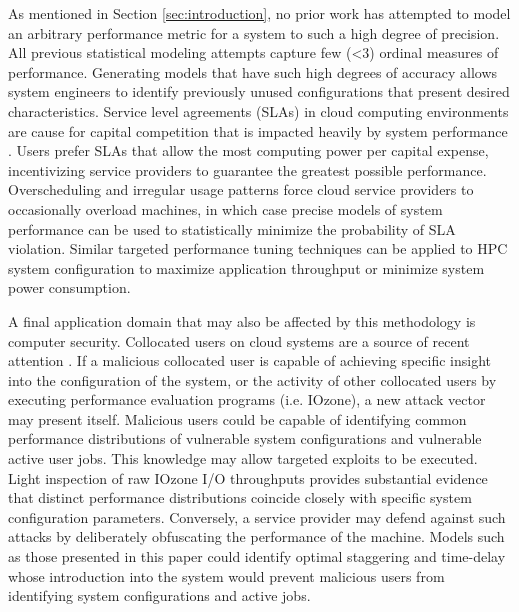 \documentclass[letterpaper, 10 pt, conference]{ieeeconf}  %
\begin{document}
As mentioned in Section \ref{sec:introduction}, no prior work has attempted to model an arbitrary performance metric for a system to such a high degree of precision. All previous statistical modeling attempts capture few (\textless 3) ordinal measures of performance. Generating models that have such high degrees of accuracy allows system engineers to identify previously unused configurations that present desired characteristics. Service level agreements (SLAs) in cloud computing environments are cause for capital competition that is impacted heavily by system performance \cite{patel2009service}. Users prefer SLAs that allow the most computing power per capital expense, incentivizing service providers to guarantee the greatest possible performance. Overscheduling and irregular usage patterns force cloud service providers to occasionally overload machines, in which case precise models of system performance can be used to statistically minimize the probability of SLA violation. Similar targeted performance tuning techniques can be applied to HPC system configuration to maximize application throughput or minimize system power consumption.

A final application domain that may also be affected by this methodology is computer security. Collocated users on cloud systems are a source of recent attention \cite{ali2015security}. If a malicious collocated user is capable of achieving specific insight into the configuration of the system, or the activity of other collocated users by executing performance evaluation programs (i.e. IOzone), a new attack vector may present itself. Malicious users could be capable of identifying common performance distributions of vulnerable system configurations and vulnerable active user jobs. This knowledge may allow targeted exploits to be executed. Light inspection of raw IOzone I/O throughputs provides substantial evidence that distinct performance distributions coincide closely with specific system configuration parameters. Conversely, a service provider may defend against such attacks by deliberately obfuscating the performance of the machine. Models such as those presented in this paper could identify optimal staggering and time-delay whose introduction into the system would prevent malicious users from identifying system configurations and active jobs.
\end{document}
